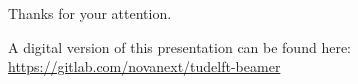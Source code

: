 \documentclass[aspectratio=43]{beamer}
\begin{document}
\begin{frame}
  Thanks for your attention.

  A digital version of this presentation can be found here:
  \vfill
  \url{https://gitlab.com/novanext/tudelft-beamer} 
  \vfill  
  \centering
  \vfill
\end{frame}


\begin{frame}[allowframebreaks,t]{\bibname}
	\AtNextBibliography{\footnotesize}%
	\printbibliography
\end{frame}
\end{document}
